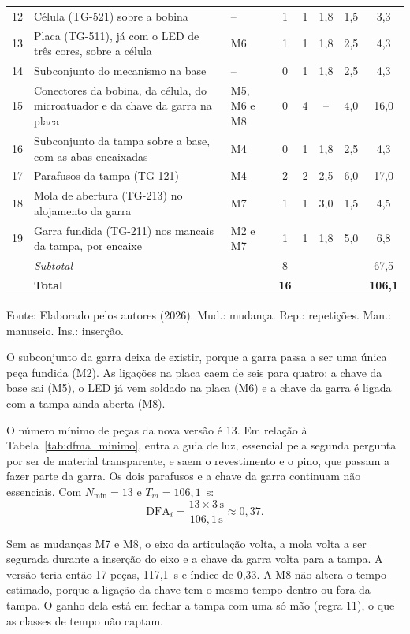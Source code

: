 \begin{longtable}{@{}c >{\RaggedRight\arraybackslash}p{5.9cm} >{\RaggedRight\arraybackslash}p{1.1cm} c c c c c@{}}
    12 & Célula (TG-521) sobre a bobina & -- & 1 & 1 & 1,8 & 1,5 & 3,3 \\
    13 & Placa (TG-511), já com o LED de três cores, sobre a célula & M6 & 1 & 1 & 1,8 & 2,5 & 4,3 \\
    14 & Subconjunto do mecanismo na base & -- & 0 & 1 & 1,8 & 2,5 & 4,3 \\
    15 & Conectores da bobina, da célula, do microatuador e da chave da garra na placa & M5, M6 e M8 & 0 & 4 & -- & 4,0 & 16,0 \\
    16 & Subconjunto da tampa sobre a base, com as abas encaixadas & M4 & 0 & 1 & 1,8 & 2,5 & 4,3 \\
    17 & Parafusos da tampa (TG-121) & M4 & 2 & 2 & 2,5 & 6,0 & 17,0 \\
    18 & Mola de abertura (TG-213) no alojamento da garra & M7 & 1 & 1 & 3,0 & 1,5 & 4,5 \\
    19 & Garra fundida (TG-211) nos mancais da tampa, por encaixe & M2 e M7 & 1 & 1 & 1,8 & 5,0 & 6,8 \\
    & \textit{Subtotal} & & 8 & & & & 67,5 \\
    \midrule
    & \textbf{Total} & & \textbf{16} & & & & \textbf{106,1} \\
\end{longtable}
\endgroup
\begin{center}
    \footnotesize Fonte: Elaborado pelos autores (2026). Mud.: mudança. Rep.: repetições. Man.: manuseio. Ins.: inserção.
\end{center}

O subconjunto da garra deixa de existir, porque a garra passa a ser uma única peça fundida (M2). As ligações na placa caem de seis para quatro: a chave da base sai (M5), o LED já vem soldado na placa (M6) e a chave da garra é ligada com a tampa ainda aberta (M8).

O número mínimo de peças da nova versão é 13. Em relação à Tabela~\ref{tab:dfma_minimo}, entra a guia de luz, essencial pela segunda pergunta por ser de material transparente, e saem o revestimento e o pino, que passam a fazer parte da garra. Os dois parafusos e a chave da garra continuam não essenciais. Com $N_{\min} = 13$ e $T_m = 106{,}1$~s:
\begin{equation}
\mathrm{DFA}_i = \frac{13 \times 3\,\text{s}}{106{,}1\,\text{s}} \approx 0{,}37.
\label{eq:dfa_aprimorado}
\end{equation}

Sem as mudanças M7 e M8, o eixo da articulação volta, a mola volta a ser segurada durante a inserção do eixo e a chave da garra volta para a tampa. A versão teria então 17 peças, 117,1~s e índice de 0,33. A M8 não altera o tempo estimado, porque a ligação da chave tem o mesmo tempo dentro ou fora da tampa. O ganho dela está em fechar a tampa com uma só mão (regra 11), o que as classes de tempo não captam.

